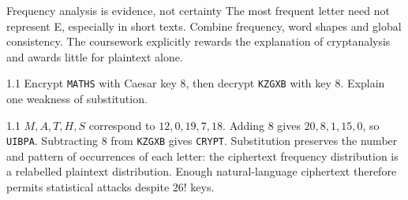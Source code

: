 \documentclass[11pt,a4paper]{article}
\begin{document}
\begin{tip}{Frequency analysis is evidence, not certainty}
The most frequent letter need not represent E, especially in short texts. Combine frequency, word shapes and global consistency. The coursework explicitly rewards the explanation of cryptanalysis and awards little for plaintext alone.
\end{tip}
\begin{question}{1.1}
Encrypt \texttt{MATHS} with Caesar key 8, then decrypt \texttt{KZGXB} with key 8. Explain one weakness of substitution.
\end{question}
\begin{answer}{1.1}
\(M,A,T,H,S\) correspond to \(12,0,19,7,18\). Adding 8 gives \(20,8,1,15,0\), so \texttt{UIBPA}. Subtracting 8 from \texttt{KZGXB} gives \texttt{CRYPT}. Substitution preserves the number and pattern of occurrences of each letter: the ciphertext frequency distribution is a relabelled plaintext distribution. Enough natural-language ciphertext therefore permits statistical attacks despite \(26!\) keys.
\end{answer}
\end{document}
